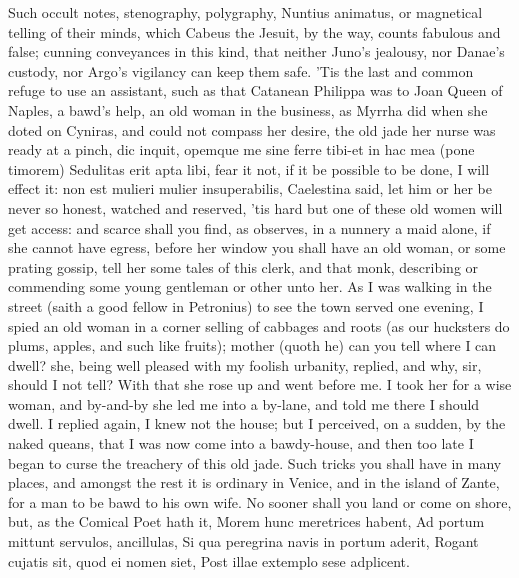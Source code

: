 Such occult notes, stenography, polygraphy, Nuntius animatus, or
magnetical telling of their minds, which Cabeus the Jesuit, by
the way, counts fabulous and false; cunning conveyances in this kind,
that neither Juno's jealousy, nor Danae's custody, nor Argo's vigilancy
can keep them safe. 'Tis the last and common refuge to use an
assistant, such as that Catanean Philippa was to Joan Queen of Naples,
a bawd's help, an old woman in the business, as Myrrha did
when she doted on Cyniras, and could not compass her desire, the old
jade her nurse was ready at a pinch, dic inquit, opemque me sine ferre
tibi-et in hac mea (pone timorem) Sedulitas erit apta libi, fear it
not, if it be possible to be done, I will effect it: non est mulieri
mulier insuperabilis, Caelestina said, let him or her be never so
honest, watched and reserved, 'tis hard but one of these old women will
get access: and scarce shall you find, as \Austin{} observes, in a
nunnery a maid alone, if she cannot have egress, before her window you
shall have an old woman, or some prating gossip, tell her some tales of
this clerk, and that monk, describing or commending some young
gentleman or other unto her. As I was walking in the street (saith a
good fellow in Petronius) to see the town served one evening, I
spied an old woman in a corner selling of cabbages and roots (as our
hucksters do plums, apples, and such like fruits); mother (quoth he)
can you tell where I can dwell? she, being well pleased with my foolish
urbanity, replied, and why, sir, should I not tell? With that she rose
up and went before me. I took her for a wise woman, and by-and-by she
led me into a by-lane, and told me there I should dwell. I replied
again, I knew not the house; but I perceived, on a sudden, by the naked
queans, that I was now come into a bawdy-house, and then too late I
began to curse the treachery of this old jade. Such tricks you shall
have in many places, and amongst the rest it is ordinary in Venice, and
in the island of Zante, for a man to be bawd to his own wife. No sooner
shall you land or come on shore, but, as the Comical Poet hath it,
Morem hunc meretrices habent,
Ad portum mittunt servulos, ancillulas,
Si qua peregrina navis in portum aderit,
Rogant cujatis sit, quod ei nomen siet,
Post illae extemplo sese adplicent.

